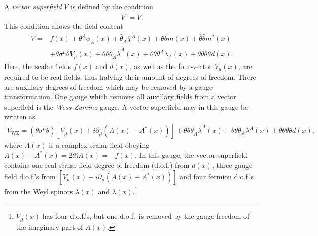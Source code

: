 \documentclass[twoside,english]{uiofysmaster}
\begin{document}
A {\it vector superfield} $V$ is defined by the condition
\begin{align}
	V^\dag = V.
\end{align}
This condition allows the field content
\begin{align}
	V = &f(x) + \theta^A\phi_A(x) + \bar\theta_{\dot A}\bar\chi^{\dot A}(x) + \theta \theta m(x) + \bar\theta \bar\theta m^*(x)\\
	 &+ \theta\sigma^\mu \bar\theta V_\mu(x) + \theta\theta\bar\theta_{\dot A}\bar\lambda^{\dot A}(x) + \bar\theta \bar\theta \theta^A \lambda_A(x) + \theta \theta \bar\theta \bar\theta d(x).
\end{align}
Here, the scalar fields $f(x)$ and $d(x)$, as well as the four-vector $V_\mu (x)$, are required to be real fields, thus halving their amount of degrees of freedom. There are auxillary degrees of freedom which may be removed by a gauge transformation. One gauge which removes all auxillary fields from a vector superfield is the {\it Wess-Zumino} gauge. A vector superfield may in this gauge be written as
\begin{align}
	V_\mathrm{WZ} = (\theta \sigma^\mu \bar\theta) \left[ V_\mu(x) + i\partial_\mu (A(x) - A^*(x)) \right] + \theta\theta \bar\theta_{\dot A} \bar\lambda^{\dot A}(x) + \bar\theta \bar\theta \theta_A \lambda^A(x) + \theta\theta \bar\theta \bar\theta d(x),
\end{align}
where $A(x)$ is a complex scalar field obeying $A(x) + A^*(x) = 2\Re A(x) = -f(x)$. In this gauge, the vector superfield contains one real scalar field degree of freedom (d.o.f.) from $d(x)$, three gauge field d.o.f.'s from $\left[ V_\mu(x) + i\partial_\mu (A(x) - A^*(x)) \right]$ and four fermion d.o.f.'s from the Weyl spinors $\lambda(x)$ and $\bar\lambda(x)$.\footnote{$V_\mu(x)$ has four d.o.f.'s, but one d.o.f.\ is removed by the gauge freedom of the imaginary part of $A(x)$.}
\end{document}

